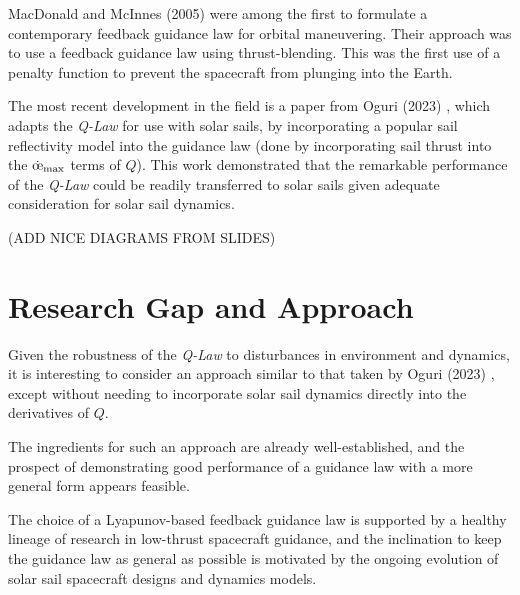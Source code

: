 MacDonald and McInnes (2005) \cite{macdonald2005analytical} were among the first to formulate a contemporary feedback guidance law for orbital maneuvering. Their approach was to use a feedback guidance law using thrust-blending. This was the first use of a penalty function to prevent the spacecraft from plunging into the Earth.

The most recent development in the field is a paper from Oguri (2023) \cite{oguri2023solar}, which adapts the \textit{Q-Law} for use with solar sails, by incorporating a popular sail reflectivity model into the guidance law (done by incorporating sail thrust into the $\dot{\moe}_{\max}$ terms of $Q$). This work demonstrated that the remarkable performance of the \textit{Q-Law} could be readily transferred to solar sails given adequate consideration for solar sail dynamics.

(ADD NICE DIAGRAMS FROM SLIDES)

\section{Research Gap and Approach}
Given the robustness of the \textit{Q-Law} to disturbances in environment and dynamics, it is interesting to consider an approach similar to that taken by Oguri (2023) \cite{oguri2023solar}, except without needing to incorporate solar sail dynamics directly into the derivatives of $Q$.

The ingredients for such an approach are already well-established, and the prospect of demonstrating good performance of a guidance law with a more general form appears feasible.

The choice of a Lyapunov-based feedback guidance law is supported by a healthy lineage of research in low-thrust spacecraft guidance, and the inclination to keep the guidance law as general as possible is motivated by the ongoing evolution of solar sail spacecraft designs and dynamics models.